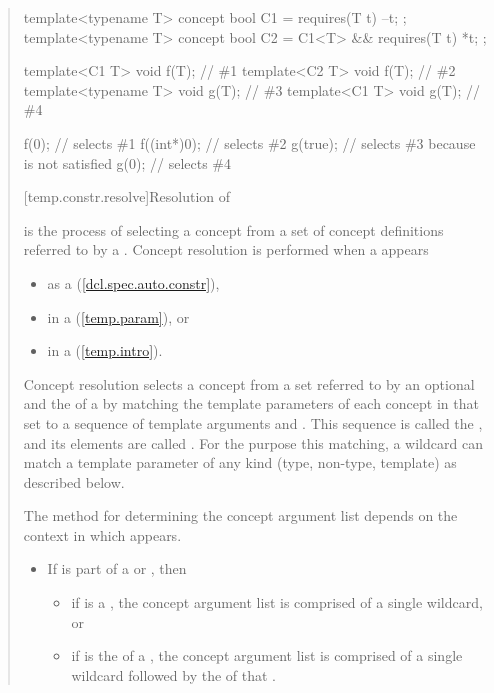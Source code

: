 \begin{quote}
\enterexample
\begin{codeblock}
template<typename T> concept bool C1 = requires(T t) { --t; };
template<typename T> concept bool C2 = C1<T> && requires(T t) { *t; };

template<C1 T> void f(T);       // \#1
template<C2 T> void f(T);       // \#2
template<typename T> void g(T); // \#3
template<C1 T> void g(T);       // \#4

f(0);       // selects \#1
f((int*)0); // selects \#2
g(true);    // selects \#3 because  is not satisfied
g(0);       // selects \#4
\end{codeblock}
\exitexample


[temp.constr.resolve]{Resolution of }

\pnum
{} is the process of selecting a concept 
from a set of concept definitions referred to by a 
.
% 
Concept resolution is performed when a  
appears
\begin{itemize}
\item as a  (\ref{dcl.spec.auto.constr}), 
\item in a  (\ref{temp.param}), or 
\item in a  (\ref{temp.intro}).
\end{itemize}

\pnum
Concept resolution selects a concept from a set referred to by an
optional  and the  
of a  by matching the template parameters 
of each concept in that set to a sequence of template arguments and 
.
% 
This sequence is called the , and its elements
are called .
% 
For the purpose this matching, a wildcard can match a template 
parameter of any kind (type, non-type, template) as described below.

\pnum
The method for determining the concept argument list depends on the
context in which   appears.
% 
\begin{itemize}
\item If  is part of a  or 
,
then
  \begin{itemize}
  \item if  is a , the concept 
  argument list is comprised of a single wildcard, or
  \item if  is the  of a 
  , the concept argument list is comprised of a
  single wildcard followed by the  of that 
  .
  \end{itemize}


\end{itemize}
\end{quote}
